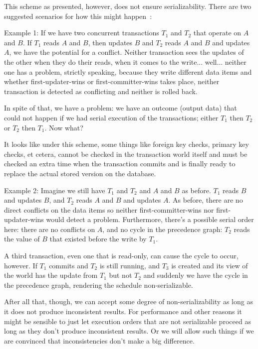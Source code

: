 This scheme as presented, however, does not ensure serializability. There are two suggested scenarios for how this might happen~\cite{dsc}:

Example 1: If we have two concurrent transactions $T_{1}$ and $T_{2}$ that operate on $A$ and $B$. If $T_{1}$ reads $A$ and $B$, then updates $B$ and $T_{2}$ reads $A$ and $B$ and updates $A$, we have the potential for a conflict. Neither transaction sees the updates of the other when they do their reads, when it comes to the write... well... neither one has a problem, strictly speaking, because they write different data items and whether first-updater-wins or first-committer-wins takes place, neither transaction is detected as conflicting and neither is rolled back.

In spite of that, we have a problem: we have an outcome (output data) that could not happen if we had serial execution of the transactions; either $T_{1}$ then $T_{2}$ or $T_{2}$ then $T_{1}$. Now what? 

It looks like under this scheme, some things like foreign key checks, primary key checks, et cetera, cannot be checked in the transaction world itself and must be checked an extra time when the transaction commits and is finally ready to replace the actual stored version on the database.

Example 2: Imagine we still have $T_{1}$ and $T_{2}$ and $A$ and $B$ as before. $T_{1}$ reads $B$ and updates $B$, and $T_{2}$ reads $A$ and $B$ and updates $A$. As before, there are no direct conflicts on the data items so neither first-committer-wins nor first-updater-wins would detect a problem. Furthermore, there's a possible serial order here: there are no conflicts on $A$, and no cycle in the precedence graph: $T_{2}$ reads the value of $B$ that existed before the write by $T_{1}$. 

A third transaction, even one that is read-only, can cause the cycle to occur, however. If $T_{1}$ commits and $T_{2}$ is still running, and $T_{3}$ is created and its view of the world has the update from $T_{1}$ but not $T_{2}$ and suddenly we have the cycle in the precedence graph, rendering the schedule non-serializable.

After all that, though, we can accept some degree of non-serializability as long as it does not produce inconsistent results. For performance and other reasons it might be sensible to just let execution orders that are not serializable proceed as long as they don't produce inconsistent results.  Or we will allow such things if we are convinced that inconsistencies don't make a big difference. 

